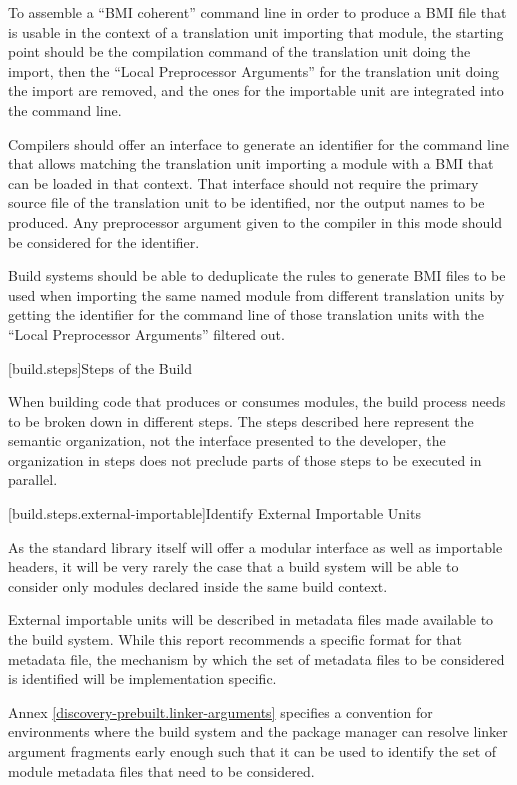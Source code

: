 \pnum To assemble a ``BMI coherent'' command line in order to produce
a BMI file that is usable in the context of a translation unit
importing that module, the starting point should be the compilation
command of the translation unit doing the import, then the ``Local
Preprocessor Arguments'' for the translation unit doing the import are
removed, and the ones for the importable unit are integrated into the
command line.

\pnum Compilers should offer an interface to generate an identifier
for the command line that allows matching the translation unit
importing a module with a BMI that can be loaded in that context. That
interface should not require the primary source file of the
translation unit to be identified, nor the output names to be
produced. Any preprocessor argument given to the compiler in this mode
should be considered for the identifier.

\pnum Build systems should be able to deduplicate the rules to
generate BMI files to be used when importing the same named module
from different translation units by getting the identifier for the
command line of those translation units with the ``Local Preprocessor
Arguments'' filtered out.

[build.steps]{Steps of the Build}

\pnum When building \Cpp{} code that produces or consumes modules, the
build process needs to be broken down in different steps. The steps
described here represent the semantic organization, not the interface
presented to the \Cpp{} developer, the organization in steps does not
preclude parts of those steps to be executed in parallel.

[build.steps.external-importable]{Identify External Importable Units}

\pnum As the \Cpp{} standard library itself will offer a modular
interface as well as importable headers, it will be very rarely the
case that a build system will be able to consider only modules
declared inside the same build context.

\pnum External importable units will be described in metadata files
made available to the build system. While this report recommends a
specific format for that metadata file, the mechanism by which the set
of metadata files to be considered is identified will be
implementation specific.

\pnum Annex \ref{discovery-prebuilt.linker-arguments} specifies a
convention for environments where the build system and the package
manager can resolve linker argument fragments early enough such that
it can be used to identify the set of module metadata files that need
to be considered.

